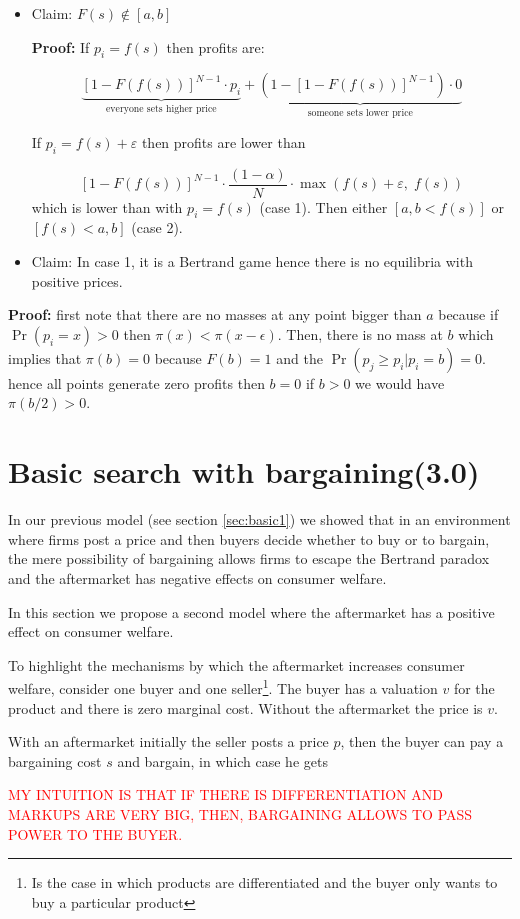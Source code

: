 \documentclass[12pt]{article}
\theoremstyle{plain}
\theoremstyle{plain}
\begin{document}
\begin{itemize}
    \item Claim: $F(s) \notin [a,b]$
 

\textbf{Proof:} If $p_i = f(s)$ then profits are:

\[
\underbrace{[1 - F(f(s))]^{N-1} \cdot p_i}_{\text{everyone sets higher price}} + 
\underbrace{(1 - \left[1 - F(f(s))\right]^{N-1}) \cdot 0}_{\text{someone sets lower price}}
\]


If $p_i = f(s) + \varepsilon$ then profits are lower than

\[
[1 - F(f(s))]^{N-1} \cdot \frac{(1 - \alpha)}{N} \cdot \max(f(s)+\varepsilon,\; f(s))
\]
which is lower than with  $p_i = f(s)$ (case 1). Then either $[a,b < f(s)]$ or $[f(s)< a,b]$ (case 2). 

\item Claim: In case 1, it is a Bertrand game hence there is no equilibria with positive prices. 
\end{itemize}

\textbf{Proof:} first note that there are no masses at any point bigger than $a$ because if $\Pr(p_i = x) > 0$ then $\pi(x) < \pi(x-\epsilon)$. Then, there is no mass at $b$ which implies that $\pi(b) = 0$ because $F(b) =1 $ and the $\Pr(p_j \geq p_i| p_i = b) =  0 $. hence all points generate zero profits then $b =0 $ if $b> 0$ we would have $\pi(b/2) > 0$. 


\section{Basic search with bargaining(3.0)}

In our previous model (see section \ref{sec:basic1}) we showed that in an environment where firms post a price and then buyers decide whether to buy or to bargain, the mere possibility of bargaining allows firms to escape the Bertrand paradox and the aftermarket has negative effects on consumer welfare. 

In this section we propose a second model where the aftermarket has a positive effect on consumer welfare. 

To highlight the mechanisms by which the aftermarket increases consumer welfare, consider one buyer and one seller\footnote{Is the case in which products are differentiated and the buyer only wants to buy a particular product}. The buyer has a valuation $v$ for the product and there is zero marginal cost. Without the aftermarket the price is $v$. 

With an aftermarket initially the seller posts a price $p$, then the buyer can pay a bargaining cost $s$ and bargain, in which case he gets 

\textcolor{red}{MY INTUITION IS THAT IF THERE IS DIFFERENTIATION AND MARKUPS ARE VERY BIG, THEN, BARGAINING ALLOWS TO PASS POWER TO THE BUYER. }
\end{document}

